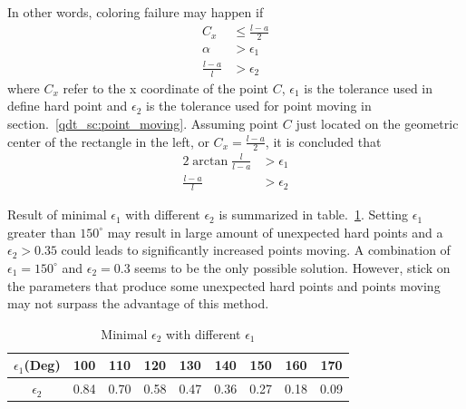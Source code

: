 In other words, coloring failure may happen if
    \begin{equation}
        \begin{aligned}
            C_x  &\leq \frac{l-a}{2} \\
            \alpha &> \epsilon_{1} \\
            \frac{l-a}{l} &> \epsilon_{2}
        \end{aligned}
    \end{equation}
where $C_x$ refer to the x coordinate of the point $C$, $\epsilon_1$ is the tolerance used in define hard point and $\epsilon_2$ is the tolerance used for point moving in section.~\ref{qdt_sc:point_moving}.
Assuming point $C$ just located on the geometric center of the rectangle in the left, or $C_x = \frac{l-a}{2}$, it is concluded that 
    \begin{equation}
        \begin{aligned}
            2 \arctan \frac{l}{l-a} &> \epsilon_1 \\
            \frac{l-a}{l} &> \epsilon_{2}
        \end{aligned}
    \end{equation}

Result of minimal $\epsilon_1$ with different $\epsilon_2$ is summarized in table.~\ref{qdt_tab:qdt_coloring_ep1_ep2}.
Setting $\epsilon_1$ greater than $150^\circ$ may result in large amount of unexpected hard points and a $\epsilon_2 > 0.35$ could leads to significantly increased points moving.
A combination of $\epsilon_1 = 150^\circ$ and $\epsilon_2 = 0.3$ seems to be the only possible solution.
However, stick on the parameters that produce some unexpected hard points and points moving may not surpass the advantage of this method.

    \begin{table}[!ht]
        \centering
        \caption{Minimal $\epsilon_2$ with different $\epsilon_1$}
        \label{qdt_tab:qdt_coloring_ep1_ep2}
        \begin{tabular}{ccccccccc}
            \toprule
            $\epsilon_1$(Deg) & 100    & 110      & 120     & 130      & 140     & 150   &   160  &  170   \\
            \midrule    
            $\epsilon_2$ & 0.84 & 0.70 & 0.58 & 0.47 & 0.36 & 0.27 &    0.18 &  0.09\\
            \bottomrule
        \end{tabular}
    \end{table}

